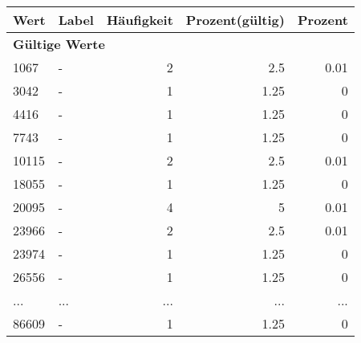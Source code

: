      \begin{longtable}{lXrrr}
     \toprule
     \textbf{Wert} & \textbf{Label} & \textbf{Häufigkeit} & \textbf{Prozent(gültig)} & \textbf{Prozent} \\
     \endhead
     \midrule
     \multicolumn{5}{l}{\textbf{Gültige Werte}}\\
        1067 & \multicolumn{1}{X}{-} & %
          \num{2} &
          \num[round-mode=places,round-precision=2]{2,5} &
          \num[round-mode=places,round-precision=2]{0,01} \\
        3042 & \multicolumn{1}{X}{-} & %
          \num{1} &
          \num[round-mode=places,round-precision=2]{1,25} &
          \num[round-mode=places,round-precision=2]{0} \\
        4416 & \multicolumn{1}{X}{-} & %
          \num{1} &
          \num[round-mode=places,round-precision=2]{1,25} &
          \num[round-mode=places,round-precision=2]{0} \\
        7743 & \multicolumn{1}{X}{-} & %
          \num{1} &
          \num[round-mode=places,round-precision=2]{1,25} &
          \num[round-mode=places,round-precision=2]{0} \\
        10115 & \multicolumn{1}{X}{-} & %
          \num{2} &
          \num[round-mode=places,round-precision=2]{2,5} &
          \num[round-mode=places,round-precision=2]{0,01} \\
        18055 & \multicolumn{1}{X}{-} & %
          \num{1} &
          \num[round-mode=places,round-precision=2]{1,25} &
          \num[round-mode=places,round-precision=2]{0} \\
        20095 & \multicolumn{1}{X}{-} & %
          \num{4} &
          \num[round-mode=places,round-precision=2]{5} &
          \num[round-mode=places,round-precision=2]{0,01} \\
        23966 & \multicolumn{1}{X}{-} & %
          \num{2} &
          \num[round-mode=places,round-precision=2]{2,5} &
          \num[round-mode=places,round-precision=2]{0,01} \\
        23974 & \multicolumn{1}{X}{-} & %
          \num{1} &
          \num[round-mode=places,round-precision=2]{1,25} &
          \num[round-mode=places,round-precision=2]{0} \\
        26556 & \multicolumn{1}{X}{-} & %
          \num{1} &
          \num[round-mode=places,round-precision=2]{1,25} &
          \num[round-mode=places,round-precision=2]{0} \\
       ... & ... & ... & ... & ... \\
        86609 & \multicolumn{1}{X}{-} & %
          \num{1} &
          \num[round-mode=places,round-precision=2]{1,25} &
          \num[round-mode=places,round-precision=2]{0} \\


\end{longtable}
